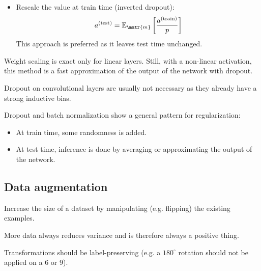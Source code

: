 \begin{description}
\begin{description}
\begin{itemize}
                    \item Rescale the value at train time (inverted dropout):
                        \[ a^\text{(test)} = \mathbb{E}_\matr{m} \left[ \frac{a^\text{(train)}}{p} \right] \]
                        This approach is preferred as it leaves test time unchanged.
                \end{itemize}

                \begin{remark}
                    Weight scaling is exact only for linear layers. Still, with a non-linear activation, this method is a fast approximation of the output of the network with dropout.
                \end{remark}
        \end{description}
\end{description}

\begin{remark}
    Dropout on convolutional layers are usually not necessary as they already have a strong inductive bias.
\end{remark}

\begin{remark}
    Dropout and batch normalization show a general pattern for regularization:
    \begin{itemize}
        \item At train time, some randomness is added.
        \item At test time, inference is done by averaging or approximating the output of the network.
    \end{itemize}
\end{remark}


\subsection{Data augmentation}

Increase the size of a dataset by manipulating (e.g. flipping) the existing examples.

\begin{remark}
    More data always reduces variance and is therefore always a positive thing.
\end{remark}

\begin{remark}
    Transformations should be label-preserving (e.g. a $180^\circ$ rotation should not be applied on a $6$ or $9$).
\end{remark}


